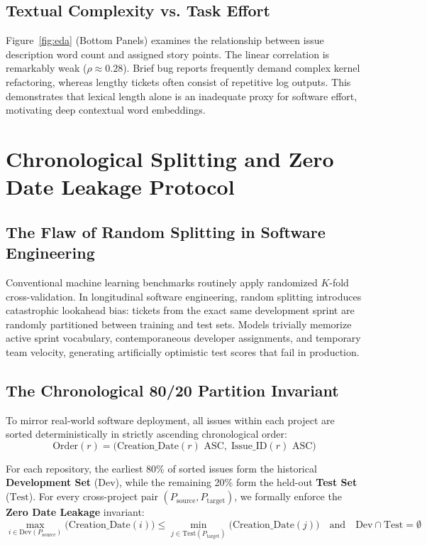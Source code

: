 \documentclass[11pt,a4paper]{article}
\begin{document}
\subsection{Textual Complexity vs. Task Effort}
Figure~\ref{fig:eda} (Bottom Panels) examines the relationship between issue description word count and assigned story points. The linear correlation is remarkably weak ($\rho \approx 0.28$). Brief bug reports frequently demand complex kernel refactoring, whereas lengthy tickets often consist of repetitive log outputs. This demonstrates that lexical length alone is an inadequate proxy for software effort, motivating deep contextual word embeddings.

\section{Chronological Splitting and Zero Date Leakage Protocol}
\label{sec:splitting}

\subsection{The Flaw of Random Splitting in Software Engineering}
Conventional machine learning benchmarks routinely apply randomized $K$-fold cross-validation. In longitudinal software engineering, random splitting introduces catastrophic lookahead bias: tickets from the exact same development sprint are randomly partitioned between training and test sets. Models trivially memorize active sprint vocabulary, contemporaneous developer assignments, and temporary team velocity, generating artificially optimistic test scores that fail in production.

\subsection{The Chronological 80/20 Partition Invariant}
To mirror real-world software deployment, all issues within each project are sorted deterministically in strictly ascending chronological order:
\begin{equation}
\text{Order}(r) = \Big(\text{Creation\_Date}(r) \text{ ASC}, \; \text{Issue\_ID}(r) \text{ ASC}\Big)
\end{equation}

For each repository, the earliest 80\% of sorted issues form the historical \textbf{Development Set} ($\text{Dev}$), while the remaining 20\% form the held-out \textbf{Test Set} ($\text{Test}$). For every cross-project pair $(P_{\text{source}}, P_{\text{target}})$, we formally enforce the \textbf{Zero Date Leakage} invariant:
\begin{equation}
\max_{i \in \text{Dev}(P_{\text{source}})} \Big(\text{Creation\_Date}(i)\Big) \le \min_{j \in \text{Test}(P_{\text{target}})} \Big(\text{Creation\_Date}(j)\Big) \quad \text{and} \quad \text{Dev} \cap \text{Test} = \emptyset
\end{equation}
\end{document}
